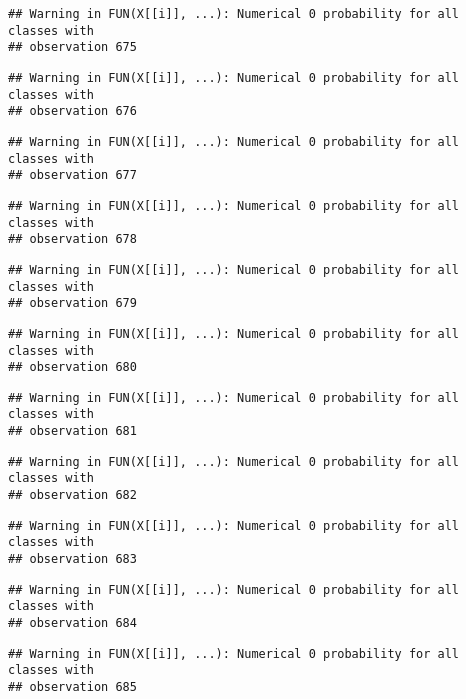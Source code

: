 \documentclass[
]{article}
\begin{document}
\begin{verbatim}
## Warning in FUN(X[[i]], ...): Numerical 0 probability for all classes with
## observation 675
\end{verbatim}

\begin{verbatim}
## Warning in FUN(X[[i]], ...): Numerical 0 probability for all classes with
## observation 676
\end{verbatim}

\begin{verbatim}
## Warning in FUN(X[[i]], ...): Numerical 0 probability for all classes with
## observation 677
\end{verbatim}

\begin{verbatim}
## Warning in FUN(X[[i]], ...): Numerical 0 probability for all classes with
## observation 678
\end{verbatim}

\begin{verbatim}
## Warning in FUN(X[[i]], ...): Numerical 0 probability for all classes with
## observation 679
\end{verbatim}

\begin{verbatim}
## Warning in FUN(X[[i]], ...): Numerical 0 probability for all classes with
## observation 680
\end{verbatim}

\begin{verbatim}
## Warning in FUN(X[[i]], ...): Numerical 0 probability for all classes with
## observation 681
\end{verbatim}

\begin{verbatim}
## Warning in FUN(X[[i]], ...): Numerical 0 probability for all classes with
## observation 682
\end{verbatim}

\begin{verbatim}
## Warning in FUN(X[[i]], ...): Numerical 0 probability for all classes with
## observation 683
\end{verbatim}

\begin{verbatim}
## Warning in FUN(X[[i]], ...): Numerical 0 probability for all classes with
## observation 684
\end{verbatim}

\begin{verbatim}
## Warning in FUN(X[[i]], ...): Numerical 0 probability for all classes with
## observation 685
\end{verbatim}
\end{document}

